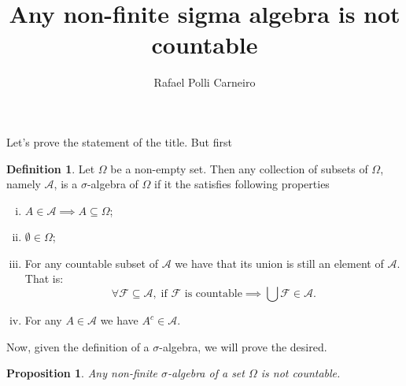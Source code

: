 \documentclass[11pt,twoside,a4paper]{article}
\title{Any non-finite sigma algebra is not countable}
\author{Rafael Polli Carneiro}
\date{}
\theoremstyle{remark}
\theoremstyle{definition}
\newtheorem{definition}{Definition}
\theoremstyle{plain}
\newtheorem{proposition}{Proposition}
\begin{document}
\maketitle

Let's prove the statement of the title. But first 
\begin{definition}
    Let $\Omega$ be a non-empty set. Then any collection of subsets of
    $\Omega$, namely $\mathcal{A}$, is a $\sigma$-algebra of $\Omega$ if
    it the satisfies following properties
    \begin{enumerate}[(i)]
        \item 
            $A \in \mathcal{A} \implies A \subseteq \Omega$;

        \item
            $\emptyset \in \Omega$;

        \item
            For any countable subset of $\mathcal{A}$ we have that
            its union is still an element of $\mathcal{A}$. That
            is:
            \begin{equation*}
                \forall \mathcal{F} \subseteq \mathcal{A},
                \;
                \text{if } \mathcal{F} \text{ is countable}
                \implies
                \bigcup \mathcal{F} \in \mathcal{A}.
            \end{equation*}

        \item
            For any $A \in \mathcal{A}$ we have $A^c \in \mathcal{A}$.
    \end{enumerate}
\end{definition}

Now, given the definition of a $\sigma$-algebra, we will prove the 
desired.
\begin{proposition}
    Any non-finite $\sigma$-algebra of a set $\Omega$ is not countable.    
\end{proposition}
\end{document}
